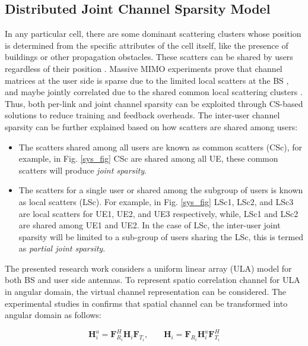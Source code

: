 \subsection{Distributed Joint Channel Sparsity Model}
\label{lbDis_JCS}
In any particular cell, there are some dominant scattering clusters whose position is determined from the specific attributes of the cell itself, like the presence of buildings or other propagation obstacles. These scatters can be shared by users regardless of their position \cite{Dict_learning}.  Massive MIMO experiments \cite{exp-vitual} prove that channel matrices at the user side is sparse due to the limited local scatters at the BS \cite{mimo-common-sparsity}, and maybe jointly correlated
due to the shared common local scattering clusters \cite{corr_pathdelay}. Thus, both per-link and joint channel sparsity can be exploited through CS-based solutions to reduce training and feedback overheads.
The inter-user channel sparsity can be further explained based on how scatters are shared among users: 
\begin{itemize}
  \item The scatters shared among all users are known as common scatters (CSc), for example, in Fig. \ref{sys_fig} CSc are shared among all UE, these common scatters will produce \textit{joint sparsity}.
  \item The scatters for a single user or shared among the subgroup of users is known as local scatters (LSc). For example, in Fig. \ref{sys_fig} LSc1, LSc2, and LSc3 are local scatters for UE1, UE2, and UE3 respectively, while, LSc1 and LSc2 are shared among UE1 and UE2. In the case of LSc, the inter-user joint sparsity will be limited to a sub-group of users sharing the LSc, this is termed as \textit{partial joint sparsity}. 
\end{itemize}

The presented research work considers a uniform linear array (ULA) model for both BS and user side antennas. To represent spatio correlation channel for ULA in angular domain, the virtual channel representation can be considered. The experimental studies in \cite{exp-vitual} confirms that spatial channel can be transformed into angular domain as follows:

\begin{equation}
\mathbf{H}_i^a=\mathbf{F}_{R_i}^H \mathbf{{H}}_i \mathbf{F}_{T_i} \text{,}\quad \quad \mathbf{H}_i=\mathbf{F}_{R_i} \mathbf{{H}}_i^a \mathbf{F}_{T_i}^H
\label{eq-VCM}
\end{equation}

